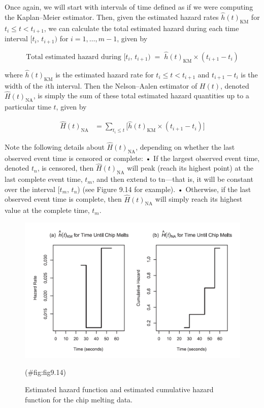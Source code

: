 \documentclass[
]{report}
\begin{document}
Once again, we will start with intervals of time defined as if we were computing the Kaplan--Meier estimator. Then, given the estimated hazard rates \(\hat h(t)_{\mathrm{KM}}\) for \(t_i \le t < t_{i+1}\), we can calculate the total estimated hazard during each time interval \([t_i,\,t_{i+1})\) for \(i = 1,\dots,m-1\), given by

\[
\text{Total estimated hazard during }[t_i,\,t_{i+1}) \;=\; \hat h(t)_{\mathrm{KM}} \times (t_{i+1} - t_i)
\]

where \(\hat h(t)_{\mathrm{KM}}\) is the estimated hazard rate for \(t_i \le t < t_{i+1}\) and \(t_{i+1} - t_i\) is the width of the \(i\)th interval. Then the Nelson--Aalen estimator of \(H(t)\), denoted \(\widehat H(t)_{\mathrm{NA}}\), is simply the sum of these total estimated hazard quantities up to a particular time \(t\), given by

\begin{align}\label{9.17}
\widehat H(t)_{\mathrm{NA}} &= \sum_{t_i \le t} \bigl[\hat h(t)_{\mathrm{KM}}\times (t_{i+1} - t_i)\bigr]
\tag{9.17}
\end{align}

Note the following details about \(\widehat H(t)_{\mathrm{NA}}\), depending on whether the last observed event time is censored
or complete:
• If the largest observed event time, denoted \(t_n\), is censored, then \(\widehat H(t)_{\mathrm{NA}}\) will peak (reach its highest
point) at the last complete event time, \(t_m\), and then extend to tn---that is, it will be constant over the
interval {[}\(t_m\), \(t_n\)) (see Figure 9.14 for example).
• Otherwise, if the last observed event time is complete, then \(\widehat H(t)_{\mathrm{NA}}\) will simply reach its highest value
at the complete time, \(t_m\).

\begin{figure}

{\centering \includegraphics[width=1\linewidth]{docs/Fig9_14} 

}

\caption{Estimated hazard function and estimated cumulative hazard function for the chip melting data.}(\#fig:fig9.14)
\end{figure}
\end{document}
